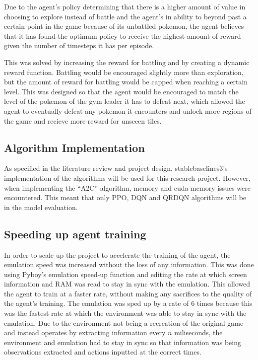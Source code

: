 Due to the agent's policy determining that there is a higher amount of value in choosing to explore instead of battle and the agent's in ability to beyond past a certain point in the game because of its unbattled pokemon, the agent believes that it has found the optimum policy to receive the highest amount of reward given the number of timesteps it has per episode. 

This was solved by increasing the reward for battling and by creating a dynamic reward function. Battling would be encouraged slightly more than exploration, but the amount of reward for battling would be capped when reaching a certain level. This was designed so that the agent would be encouraged to match the level of the pokemon of the gym leader it has to defeat next, which allowed the agent to eventually defeat any pokemon it encounters and unlock more regions of the game and recieve more reward for unsceen tiles.

\subsection{Algorithm Implementation}

As specified in the literature review and project design, stablebaselines3's implementation of the algorithms will be used for this research project. However, when implementing the ``A2C'' algorithm, memory and cuda memory issues were encountered. This meant that only PPO, DQN and QRDQN algorithms will be in the model evaluation. 

\subsection{Speeding up agent training}

In order to scale up the project to accelerate the training of the agent, the emulation speed was increased without the loss of any information. This was done using Pyboy's emulation speed-up function and editing the rate at which screen information and RAM was read to stay in sync with the emulation. This allowed the agent to train at a faster rate, without making any sacrifices to the quality of the agent's training. The emulation was sped up by a rate of 6 times because this was the fastest rate at which the environment was able to stay in sync with the emulation. Due to the environment not being a recreation of the original game and instead operates by extracting information every $n$ miliseconds, the environment and emulation had to stay in sync so that information was being observations extracted and actions inputted at the correct times.

